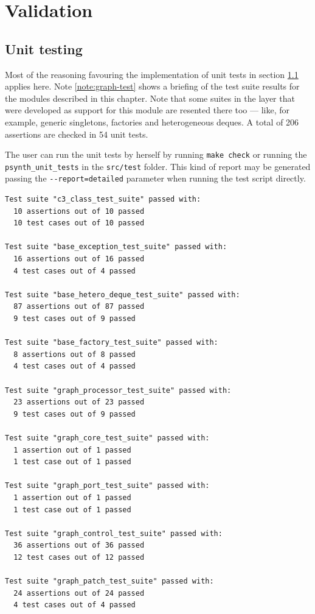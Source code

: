 
\section{Validation}

\subsection{Unit testing}
\label{sec:sound-unittest}

Most of the reasoning favouring the implementation of unit tests in
section \ref{sec:sound-unittest} applies here. Note
\ref{note:graph-test} shows a briefing of the test suite results for
the modules described in this chapter. Note that some suites in the
 layer that were developed as support for this module are
resented there too --- like, for example, generic singletons,
factories and heterogeneous deques. A total of 206 assertions are
checked in 54 unit tests.

\begin{mynote}
\label{note:graph-test}
The user can run the unit tests by herself by running \texttt{make
  check} or running the \texttt{psynth\_unit\_tests} in the
\texttt{src/test} folder. This kind of report may be generated passing
the \verb|--report=detailed| parameter when running the test script
directly.  {\small
\begin{verbatim}
Test suite "c3_class_test_suite" passed with:
  10 assertions out of 10 passed
  10 test cases out of 10 passed

Test suite "base_exception_test_suite" passed with:
  16 assertions out of 16 passed
  4 test cases out of 4 passed

Test suite "base_hetero_deque_test_suite" passed with:
  87 assertions out of 87 passed
  9 test cases out of 9 passed

Test suite "base_factory_test_suite" passed with:
  8 assertions out of 8 passed
  4 test cases out of 4 passed

Test suite "graph_processor_test_suite" passed with:
  23 assertions out of 23 passed
  9 test cases out of 9 passed

Test suite "graph_core_test_suite" passed with:
  1 assertion out of 1 passed
  1 test case out of 1 passed

Test suite "graph_port_test_suite" passed with:
  1 assertion out of 1 passed
  1 test case out of 1 passed

Test suite "graph_control_test_suite" passed with:
  36 assertions out of 36 passed
  12 test cases out of 12 passed

Test suite "graph_patch_test_suite" passed with:
  24 assertions out of 24 passed
  4 test cases out of 4 passed
\end{verbatim}
}
\end{mynote}

